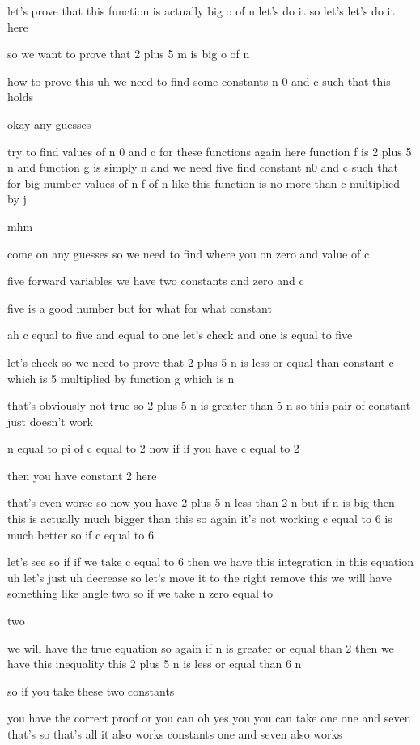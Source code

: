 let's prove that this function is actually big o of n let's do it so let's let's do it here

so we want to prove that 2 plus 5 m is big o of n

how to prove this uh we need to find some constants n 0 and c such that this holds

okay any guesses

try to find values of n 0 and c for these functions again here function f is 2 plus 5 n and function g is simply n and we need five find constant n0 and c such that for big number values of n f of n like this function is no more than c multiplied by j

mhm

come on any guesses so we need to find where you on zero and value of c

five forward variables we have two constants and zero and c

five is a good number but for what for what constant

ah c equal to five and equal to one let's check and one is equal to five

let's check so we need to prove that 2 plus 5 n is less or equal than constant c which is 5 multiplied by function g which is n

that's obviously not true so 2 plus 5 n is greater than 5 n so this pair of constant just doesn't work

n equal to pi of c equal to 2 now if if you have c equal to 2

then you have constant 2 here

that's even worse so now you have 2 plus 5 n less than 2 n but if n is big then this is actually much bigger than this so again it's not working c equal to 6 is much better so if c equal to 6

let's see so if if we take c equal to 6 then we have this integration in this equation uh let's just uh decrease so let's move it to the right remove this we will have something like angle two so if we take n zero equal to

two

we will have the true equation so again if n is greater or equal than 2 then we have this inequality this 2 plus 5 n is less or equal than 6 n

so if you take these two constants

you have the correct proof or you can oh yes you you can take one one and seven that's so that's all it also works constants one and seven also works

